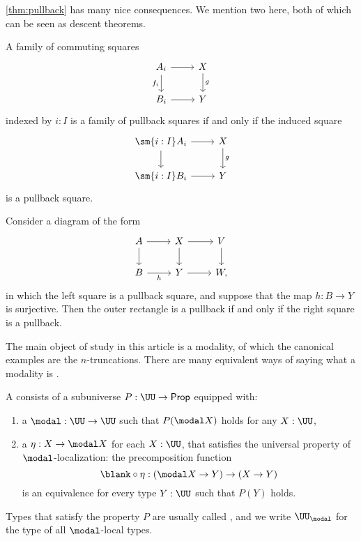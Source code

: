 \documentclass{msc}
\begin{document}
\cref{thm:pullback} has many nice consequences. We mention two here, both of which can be seen as descent theorems.

\begin{thm}\label{thm:descent-sigma}
  A family of commuting squares
\begin{equation*}
  \begin{tikzcd}
    A_i \arrow[d,swap,"f_i"] \arrow[r] & X \arrow[d,"g"] \\
    B_i \arrow[r] & Y
  \end{tikzcd}
\end{equation*}
indexed by $i:I$ is a family of pullback squares if and only if the induced square
\begin{equation*}
  \begin{tikzcd}
    \sm{i:I}A_i \arrow[d] \arrow[r] & X \arrow[d,"g"] \\
    \sm{i:I}B_i \arrow[r] & Y
  \end{tikzcd}
\end{equation*}
is a pullback square.
\end{thm}

\begin{thm}\label{thm:descent-surjective}
  Consider a diagram of the form
  \begin{equation*}
    \begin{tikzcd}
      A \arrow[d] \arrow[r] & X \arrow[d] \arrow[r] & V \arrow[d] \\
      B \arrow[r,swap,"h"] & Y \arrow[r] & W,
    \end{tikzcd}
  \end{equation*}
  in which the left square is a pullback square, and suppose that the map $h:B\to Y$ is surjective. Then the outer rectangle is a pullback if and only if the right square is a pullback.
\end{thm}

The main object of study in this article is a modality, of which the canonical examples are the $n$-truncations. There are many equivalent ways of saying what a modality is \cite{RijkeSpittersShulman}.

\begin{defn}
  A  consists of a subuniverse $P:\UU\to\mathsf{Prop}$ equipped with:
  \begin{enumerate}
  \item a  $\modal :\UU\to\UU$ such that $P(\modal X)$ holds for any $X:\UU$,
  \item a  $\eta:X\to\modal X$ for each $X:\UU$, that satisfies the universal property of $\modal$-localization: the precomposition function
    \begin{equation*}
      \blank\circ\eta : (\modal X\to Y)\to (X\to Y)
    \end{equation*}
    is an equivalence for every type $Y:\UU$ such that $P(Y)$ holds.
  \end{enumerate}
  Types that satisfy the property $P$ are usually called , and we write $\UU_\modal$ for the type of all $\modal$-local types.
\end{defn}
\end{document}
